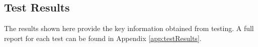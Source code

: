 \pagebreak

\subsection{Test Results} \label{sec:5.3}
The results shown here provide the key information obtained from testing. A full report for each test can be found in Appendix \ref{app:testResults}.

